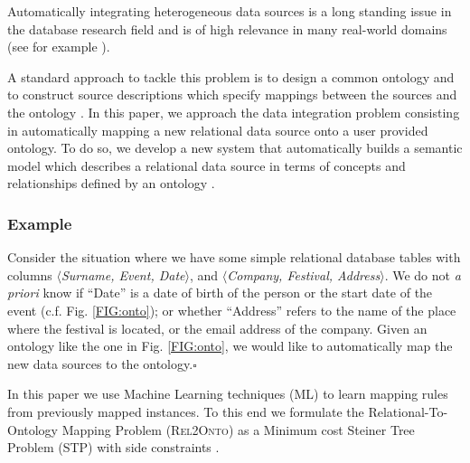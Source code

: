 \documentclass[letterpaper]{article} %
\newcommand{\relonto}{\textsc{Rel2Onto}}
\begin{document}
Automatically integrating heterogeneous data sources is a long standing issue in the database research field and is of high relevance in many real-world 
domains (see for example \cite{Rahm:2001:SAA:767149.767154,Dhamankar:imap,Taheriyan2013}).

A standard approach to tackle this problem is to design a common ontology and to construct source descriptions which specify mappings between the sources and the ontology \cite{doan2012principles}.
In this paper, we approach the data integration problem consisting in automatically mapping a new relational data source onto a user provided ontology.
To do so, we develop a new system that automatically builds a semantic model which describes a relational data source in terms of concepts and relationships defined by an ontology \cite{taheriyan2016learning}.


\subsubsection{Example} Consider the situation where we have some simple relational database tables with columns $\langle$\textit{Surname, Event, Date}$\rangle$, and 
$\langle$\textit{Company, Festival, Address}$\rangle$.
We do not \textit{a priori} know if ``Date'' is a 
date of birth of the person or the start date of the event (c.f. Fig. \ref{FIG:onto}); or whether 
``Address'' refers to the name of the place where the festival is located, or the 
email address of the company. 
Given an ontology like the one in Fig. \ref{FIG:onto}, we would like to automatically map the new data sources to  the 
ontology.\hfill$\square$

In this paper we use Machine Learning techniques (ML) to learn mapping rules from previously mapped instances.
To this end we formulate the Relational-To-Ontology Mapping Problem (\relonto{}) as a Minimum cost Steiner Tree Problem (STP) with side constraints \cite{deuna2016steiner}.
\end{document}

